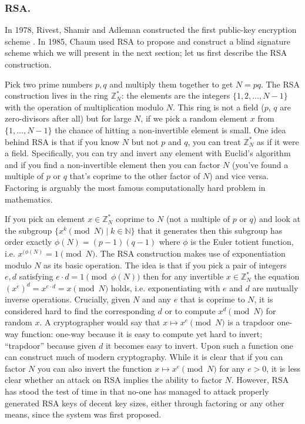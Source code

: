 \documentclass[envcountsame]{llncs}
\newenvironment{maths}{\begin{framed}
\vspace{-12pt}
\begin{figure}
\vspace{-12pt}\quad{\Huge $\sum$}
\end{figure}}{\end{framed}}
\begin{document}
\begin{maths}
\subsubsection{RSA.}
In 1978, Rivest, Shamir and Adleman constructed the first public-key encryption
scheme \cite{RSA78}. In 1985, Chaum used RSA to propose and construct a blind
signature scheme which we will present in the next section; let us first
describe the RSA construction.

Pick two prime numbers $p, q$ and multiply them together to get $N = pq$. The
RSA construction lives in the ring $\mathbb Z^*_N$: the elements are the
integers $\{1, 2, \ldots, N-1\}$ with the operation of multiplication modulo
$N$. This ring is not a field ($p$, $q$ are zero-divisors after all) but for
large $N$, if we pick a random element $x$ from $\{1, \ldots, N-1\}$ the chance
of hitting a non-invertible element is small. One idea behind RSA is that if you
know $N$ but not $p$ and $q$, you can treat $\mathbb Z^*_N$ as if it were a
field. Specifically, you can try and invert any element with Euclid's algorithm
and if you find a non-invertible element then you can factor $N$ (you've found a
multiple of $p$ or $q$ that's coprime to the other factor of $N$) and vice
versa. Factoring is arguably the most famous computationally hard problem in
mathematics.

If you pick an element $x \in \mathbb Z^*_N$ coprime to $N$ (not a multiple of
$p$ or $q$) and look at the subgroup $\{x^k \pmod{N} \mid k \in \mathbb N\}$
that it generates then this subgroup has order exactly $\phi(N) = (p-1)(q-1)$
where $\phi$ is the Euler totient function, i.e. $x^{(\phi(N)} = 1 \pmod{N}$.
The RSA construction makes use of exponentiation modulo $N$ as its basic
operation. The idea is that if you pick a pair of integers $e, d$ satisfying $e
\cdot d = 1 \pmod{\phi(N)}$ then for any invertible $x \in \mathbb Z^*_N$ the
equation $(x^e)^d = x^{e \cdot d} = x \pmod{N}$ holds, i.e. exponentiating with
$e$ and $d$ are mutually inverse operations. Crucially, given $N$ and any $e$
that is coprime to $N$, it is considered hard to find the corresponding $d$ or
to compute $x^d \pmod{N}$ for random $x$. A cryptographer would say that $x
\mapsto x^e \pmod{N}$ is a trapdoor one-way function: one-way because it is easy
to compute yet hard to invert; ``trapdoor'' because given $d$ it becomes easy to
invert. Upon such a function one can construct much of modern cryptography.
While it is clear that if you can factor $N$ you can also invert the function $x
\mapsto x^e \pmod{N}$ for any $e > 0$, it is less clear whether an attack on RSA
implies the ability to factor $N$. However, RSA has stood the test of time in
that no-one has managed to attack properly generated RSA keys of decent key
sizes, either through factoring or any other means, since the system was first
proposed.


\end{maths}
\end{document}

